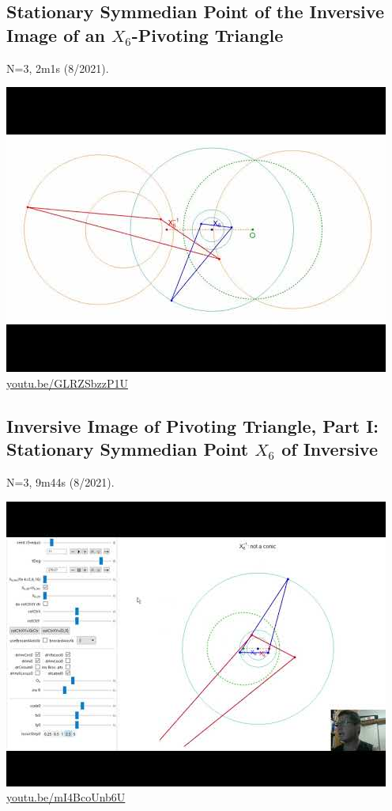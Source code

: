 \documentclass[12pt]{amsart}
\begin{document}
\subsection{Stationary Symmedian Point of the Inversive Image of an $X_{6}$-Pivoting Triangle}
\label{vid:GLRZSbzzP1U}
\noindent N=3, 2m1s (8/2021). 
\begin{center}\includegraphics[width=.5\textwidth]{pics/GLRZSbzzP1U.jpg} \\ 
\href{https://youtu.be/GLRZSbzzP1U}{\url{youtu.be/GLRZSbzzP1U}}\end{center}
% 

\subsection{Inversive Image of Pivoting Triangle, Part I: Stationary Symmedian Point $X_{6}$ of Inversive}
\label{vid:mI4BcoUnb6U}
\noindent N=3, 9m44s (8/2021). 
\begin{center}\includegraphics[width=.5\textwidth]{pics/mI4BcoUnb6U.jpg} \\ 
\href{https://youtu.be/mI4BcoUnb6U}{\url{youtu.be/mI4BcoUnb6U}}\end{center}
% 
\end{document}
